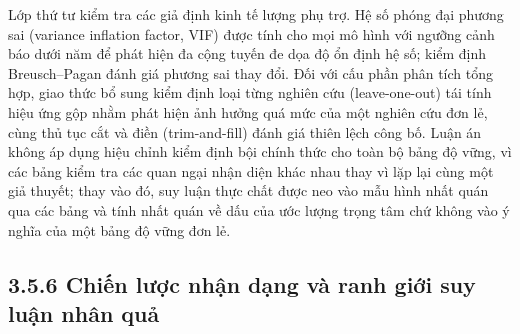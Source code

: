 \documentclass[
  a4paper,
  13pt]{extreport}
\begin{document}
Lớp thứ tư kiểm tra các giả định kinh tế lượng phụ trợ. Hệ số phóng đại
phương sai (variance inflation factor, VIF) được tính cho mọi mô hình
với ngưỡng cảnh báo dưới năm để phát hiện đa cộng tuyến đe dọa độ ổn
định hệ số; kiểm định Breusch--Pagan đánh giá phương sai thay đổi. Đối
với cấu phần phân tích tổng hợp, giao thức bổ sung kiểm định loại từng
nghiên cứu (leave-one-out) tái tính hiệu ứng gộp nhằm phát hiện ảnh
hưởng quá mức của một nghiên cứu đơn lẻ, cùng thủ tục cắt và điền
(trim-and-fill) đánh giá thiên lệch công bố. Luận án không áp dụng hiệu
chỉnh kiểm định bội chính thức cho toàn bộ bảng độ vững, vì các bảng
kiểm tra các quan ngại nhận diện khác nhau thay vì lặp lại cùng một giả
thuyết; thay vào đó, suy luận thực chất được neo vào mẫu hình nhất quán
qua các bảng và tính nhất quán về dấu của ước lượng trọng tâm chứ không
vào ý nghĩa của một bảng độ vững đơn lẻ.

\hypertarget{chiux1ebfn-lux1b0ux1ee3c-nhux1eadn-dux1ea1ng-vuxe0-ranh-giux1edbi-suy-luux1eadn-nhuxe2n-quux1ea3}{%
\subsection{3.5.6 Chiến lược nhận dạng và ranh giới suy luận nhân
quả}\label{chiux1ebfn-lux1b0ux1ee3c-nhux1eadn-dux1ea1ng-vuxe0-ranh-giux1edbi-suy-luux1eadn-nhuxe2n-quux1ea3}}
\end{document}
